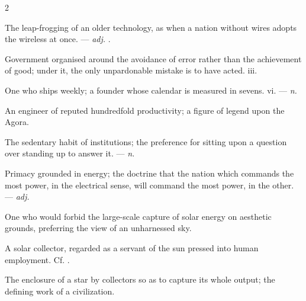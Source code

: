 \begin{multicols}{2}

 The leap-frogging of an older technology, as when a nation without wires adopts the wireless at once. —  \textit{adj.} .

 Government organised around the avoidance of error rather than the achievement of good; under it, the only unpardonable mistake is to have acted.   iii.

 One who ships weekly; a founder whose calendar is measured in sevens.   vi. —  \textit{n.}

 An engineer of reputed hundredfold productivity; a figure of legend upon the Agora.  

 The sedentary habit of institutions; the preference for sitting upon a question over standing up to answer it. —  \textit{n.}

 Primacy grounded in energy; the doctrine that the nation which commands the most power, in the electrical sense, will command the most power, in the other. —  \textit{adj.}

  One who would forbid the large-scale capture of solar energy on aesthetic grounds, preferring the view of an unharnessed sky.

 A solar collector, regarded as a servant of the sun pressed into human employment.  Cf. .

 The enclosure of a star by collectors so as to capture its whole output; the defining work of a  civilization.


\end{multicols}

